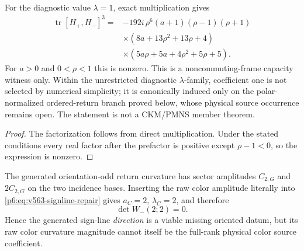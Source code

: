 \documentclass[11pt,a4paper]{article}
\begin{document}
\begin{proposition}
\label{p6:prop:v563-signline-cp-witness}
For the diagnostic value \(\lambda=1\), exact multiplication gives
\begin{align}
 \operatorname{tr}[H_+,H_-]^3
 ={}&-192i\,\rho^6(a+1)(\rho-1)(\rho+1)\nonumber\\
 &\times(8a+13\rho^2+13\rho+4)\nonumber\\
 &\times(5a\rho+5a+4\rho^2+5\rho+5).
 \label{p6:eq:v563-cp-witness}
\end{align}
For \(a>0\) and \(0<\rho<1\) this is nonzero.  This is a
noncommuting-frame capacity witness only.  Within the unrestricted diagnostic
\(\lambda\)-family, coefficient one is not selected by numerical simplicity;
it is canonically induced only on the polar-normalized ordered-return branch
proved below, whose physical source occurrence remains open.  The statement
is not a CKM/PMNS member theorem.
\end{proposition}
\begin{proof}
The factorization follows from direct multiplication.  Under the stated
conditions every real factor after the prefactor is positive except
\(\rho-1<0\), so the expression is nonzero.
\end{proof}

\begin{corollary}
\label{p6:cor:v563-raw-curvature-color-nogo}
The generated orientation-odd return curvature has sector amplitudes
\(C_{2,G}\) and \(2C_{2,G}\) on the two incidence bases.  Inserting the raw
color amplitude literally into \eqref{p6:eq:v563-signline-repair} gives
\(a_C=2\), \(\lambda_C=2\), and therefore
\[
 \boxed{\det W_-(2;2)=0.}
\]
Hence the generated sign-line \emph{direction} is a viable missing oriented
datum, but its raw color curvature magnitude cannot itself be the full-rank
physical color source coefficient.
\end{corollary}
\end{document}
